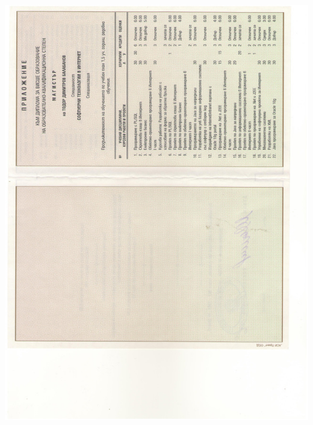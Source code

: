 \documentclass[bulgarian,a4paper]{europasscv}
\begin{document}
\includegraphics[width=\textwidth,height=\textheight,keepaspectratio]{DiplomaNBU2008_3}
\end{document}
